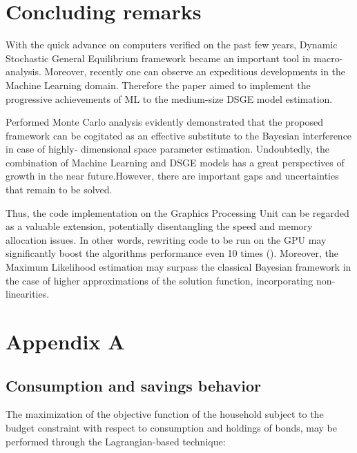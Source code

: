 \documentclass{pracamgr}
\numberwithin{equation}{section}
\begin{document}
\chapter{Concluding remarks} \label{Concluding remarks}

With the quick advance on computers verified on the past few years, Dynamic Stochastic General Equilibrium framework became an important tool in macro-analysis. Moreover, recently one can observe an expeditious developments in the Machine Learning domain. Therefore the paper aimed to implement the progressive achievements of ML to the medium-size DSGE model estimation. 

Performed Monte Carlo analysis evidently demonstrated that the proposed framework can be cogitated as an effective substitute to the Bayesian interference in case of highly- dimensional space parameter estimation. Undoubtedly, the combination of Machine Learning and DSGE models has a great perspectives of growth in the near future.However, there are important gaps and uncertainties that remain to be solved.

Thus, the code implementation on the Graphics Processing Unit can be regarded as a valuable extension, potentially disentangling the speed and memory allocation issues. In other words, rewriting code to be run on the GPU may significantly boost the algorithms performance even 10 times (\citet{michalakes2008gpu}). Moreover, the Maximum Likelihood estimation may surpass the classical Bayesian framework in the case of higher approximations of the solution function, incorporating non-linearities. 

\newpage

\nocite{*}


\newpage

\chapter*{Appendix A} \label{Appendix A}

\section*{Consumption and savings behavior}

The maximization of the objective function of the household subject to the budget constraint with respect to consumption and holdings of bonds, may be performed through the Lagrangian-based technique:
\end{document}
